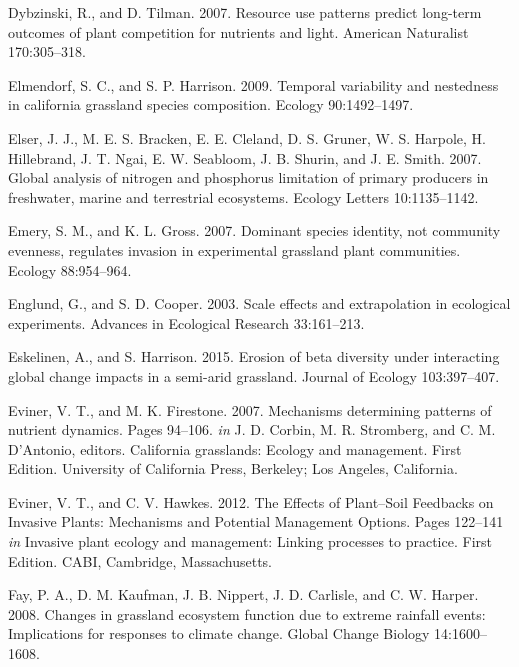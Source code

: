 \documentclass[twoside,12pt,final]{ucthesis-CA2012}
\newlength{\cslhangindent}
\newenvironment{cslreferences}%
  {\setlength{\parindent}{0pt}%
  \everypar{\setlength{\hangindent}{\cslhangindent}}\ignorespaces}%
  {\par}
\begin{document}
\begin{ucmainmatter}
\begin{cslreferences}
\leavevmode\hypertarget{ref-Dybzinski2007a}{}%
Dybzinski, R., and D. Tilman. 2007. Resource use patterns predict long-term outcomes of plant competition for nutrients and light. American Naturalist 170:305--318.

\leavevmode\hypertarget{ref-elmendorf2009}{}%
Elmendorf, S. C., and S. P. Harrison. 2009. Temporal variability and nestedness in california grassland species composition. Ecology 90:1492--1497.

\leavevmode\hypertarget{ref-Elser2007}{}%
Elser, J. J., M. E. S. Bracken, E. E. Cleland, D. S. Gruner, W. S. Harpole, H. Hillebrand, J. T. Ngai, E. W. Seabloom, J. B. Shurin, and J. E. Smith. 2007. Global analysis of nitrogen and phosphorus limitation of primary producers in freshwater, marine and terrestrial ecosystems. Ecology Letters 10:1135--1142.

\leavevmode\hypertarget{ref-Emery2007}{}%
Emery, S. M., and K. L. Gross. 2007. Dominant species identity, not community evenness, regulates invasion in experimental grassland plant communities. Ecology 88:954--964.

\leavevmode\hypertarget{ref-englund2003}{}%
Englund, G., and S. D. Cooper. 2003. Scale effects and extrapolation in ecological experiments. Advances in Ecological Research 33:161--213.

\leavevmode\hypertarget{ref-eskelinen2015}{}%
Eskelinen, A., and S. Harrison. 2015. Erosion of beta diversity under interacting global change impacts in a semi-arid grassland. Journal of Ecology 103:397--407.

\leavevmode\hypertarget{ref-eviner2007}{}%
Eviner, V. T., and M. K. Firestone. 2007. Mechanisms determining patterns of nutrient dynamics. Pages 94--106. \emph{in} J. D. Corbin, M. R. Stromberg, and C. M. D'Antonio, editors. California grasslands: Ecology and management. First Edition. University of California Press, Berkeley; Los Angeles, California.

\leavevmode\hypertarget{ref-Eviner2012}{}%
Eviner, V. T., and C. V. Hawkes. 2012. The Effects of Plant--Soil Feedbacks on Invasive Plants: Mechanisms and Potential Management Options. Pages 122--141 \emph{in} Invasive plant ecology and management: Linking processes to practice. First Edition. CABI, Cambridge, Massachusetts.

\leavevmode\hypertarget{ref-Fay2008}{}%
Fay, P. A., D. M. Kaufman, J. B. Nippert, J. D. Carlisle, and C. W. Harper. 2008. Changes in grassland ecosystem function due to extreme rainfall events: Implications for responses to climate change. Global Change Biology 14:1600--1608.


\end{cslreferences}
\end{ucmainmatter}
\end{document}
